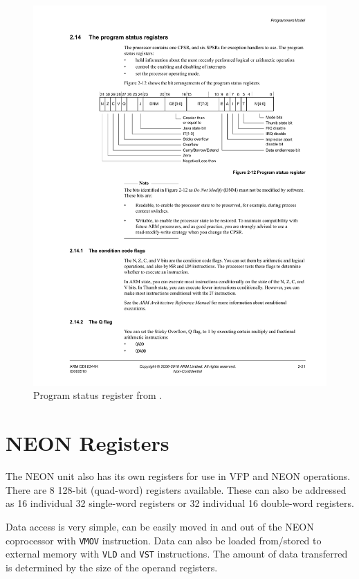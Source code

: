 \documentclass[oneside,a4paper]{report}
\begin{document}
\begin{figure}[htb]
	\centering
	\includegraphics[width=1.0\textwidth]{./fig/CPSR.pdf}
	\caption{Program status register from \cite[p. 2-21]{A8Ref}.}
	\label{fig:cpsr}
\end{figure}

\section{NEON Registers}
The NEON unit also has its own registers for use in VFP and NEON operations. There are 8 128-bit (quad-word) registers available. These can also be addressed as 16 individual 32 single-word registers or 32 individual 16 double-word registers.

Data access is very simple, can be easily moved in and out of the NEON coprocessor with \texttt{VMOV} instruction. Data can also be loaded from/stored to external memory with \texttt{VLD\*} and \texttt{VST\*} instructions. The amount of data transferred is determined by the size of the operand registers.
\end{document}
